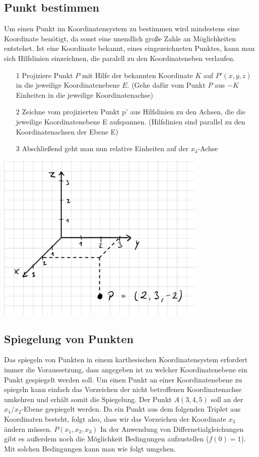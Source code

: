 \subsection{Punkt bestimmen}
Um einen Punkt im Koordinatensystem zu bestimmen wird mindestens eine Koordinate benötigt, da sonst eine unendlich große Zahle an Möglichkeiten entstehet. Ist eine Koordinate bekannt, eines eingezeichneten Punktes, kann man sich Hilfslinien einzeichnen, die paralell zu den Koordinateneben verlaufen. 
\begin{itemize}  
\item[1] Projiziere Punkt $P$ mit Hilfe der bekannten Koordinate $K$ auf $P'(x,y,z)$ in die jeweilige Koordinatenebene $E$. (Gehe dafür vom Punkt $P$ aus $-K$ Einheiten in die jeweilige Koordinatenachse)  
\item[2] Zeichne vom projizierten Punkt p' aus Hilfslinien zu den Achsen, die die jeweilige Koordinatenebene E aufspannen. (Hilfslinien sind parallel zu den Koordinatenachsen der Ebene E)   
\item[3] Abschließend geht man nun relative Einheiten auf der $x_3$-Achse   
\end{itemize} 
\includegraphics[width=10cm]{Media/punktablesen3dKoordinatensystem.jpg}
\subsection{Spiegelung von Punkten}
Das spiegeln von Punkten in einem karthesischen Koordinatensystem erfordert immer die Voraussetzung, dass angegeben ist zu welcher Koordinatenebene ein Punkt gespiegelt werden soll. Um einen Punkt an einer Koordinatenebene zu spiegeln kann einfach das Vorzeichen der nicht betroffenen Koordinatenachse umkehren und erhält somit die Spiegelung. 
Der Punkt $A(3,4,5)$ soll an der $x_1/x_2$-Ebene gespiegelt werden. Da ein Punkt 
aus dem folgenden Triplet aus Koordinaten besteht, folgt also, dass wir das
Vorzeichen der Koordinate $x_3$ ändern müssen. 
$P(x_1,x_2,x_3)$
In der Anwendung von Differnetialgleichungen gibt es außerdem noch die
Möglichkeit Bedingungen aufzustellen ($f(0)=1$). Mit solchen Bedingungen kann
man wie folgt umgehen.

